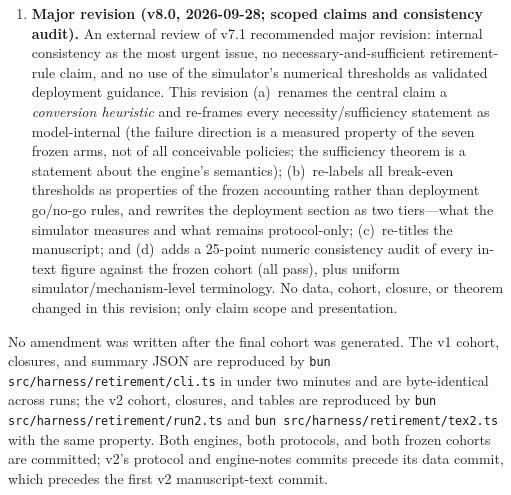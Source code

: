 \begin{enumerate}[leftmargin=*,itemsep=2pt]
does not clear a $\rho=0.8$ gate. The corrected thresholds are
$c_{0.8}\approx1{,}364$\,B pooled ($\approx1{,}047$\,B clustered,
$\approx191$\,B independent, never in global), $c_{0.85}\approx658$\,B
pooled, and $c_{0.75}\approx2{,}443$\,B pooled. No confirmatory
result changes: the frozen null closure's comparator, threshold, and
observed 29.6\% regime-O reduction at the 4{,}096\,B price are
unchanged, as are all sign tests, exposure fractions, and the
long-horizon table. What changes is the deployment advice: a pilot
must measure its round-trip price rather than assume the byte
direction clears the gate. The same error existed in the
\texttt{breakEven} helper of \texttt{exploratory.ts} (its
``\texttt{num <= 0: gate already met''} branch) and in the E1 text of
the pre-specified exploratory protocol; all three are corrected
together, and regression tests now pin the corrected semantics
against the frozen pooled means.
\item \textbf{Major revision (v8.0, 2026-09-28; scoped claims and
consistency audit).} An external review of v7.1 recommended major
revision: internal consistency as the most urgent issue, no
necessary-and-sufficient retirement-rule claim, and no use of the
simulator's numerical thresholds as validated deployment guidance.
This revision (a)~renames the central claim a \emph{conversion
heuristic} and re-frames every necessity/sufficiency statement as
model-internal (the failure direction is a measured property of the
seven frozen arms, not of all conceivable policies; the sufficiency
theorem is a statement about the engine's semantics); (b)~re-labels
all break-even thresholds as properties of the frozen accounting
rather than deployment go/no-go rules, and rewrites the deployment
section as two tiers---what the simulator measures and what remains
protocol-only; (c)~re-titles the manuscript; and (d)~adds a 25-point
numeric consistency audit of every in-text figure against the frozen
cohort (all pass), plus uniform simulator/mechanism-level
terminology. No data, cohort, closure, or theorem changed in this
revision; only claim scope and presentation.
\end{enumerate}

No amendment was written after the final cohort was generated. The
v1 cohort, closures, and summary JSON are reproduced by
\texttt{bun src/harness/retirement/cli.ts} in under two minutes and
are byte-identical across runs; the v2 cohort, closures, and tables
are reproduced by \texttt{bun src/harness/retirement/run2.ts} and
\texttt{bun src/harness/retirement/tex2.ts} with the same property.
Both engines, both protocols, and both frozen cohorts are committed;
v2's protocol and engine-notes commits precede its data commit, which
precedes the first v2 manuscript-text commit.


